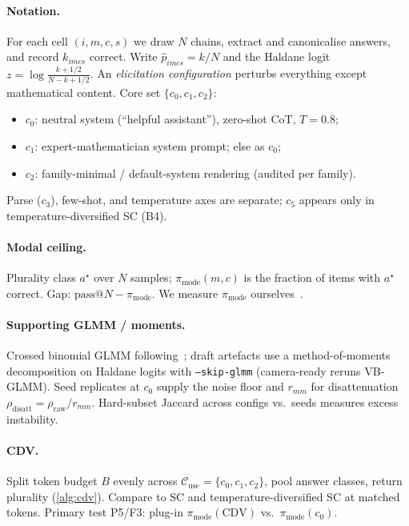 \documentclass{article}
\newcommand{\pmode}{\pi_{\mathrm{mode}}}
\newcommand{\phat}{\hat{p}}
\newcommand{\rdis}{\rho_{\mathrm{disatt}}}
\begin{document}
\paragraph{Notation.}
For each cell $(i,m,c,s)$ we draw $N$ chains, extract and canonicalise answers,
and record $k_{imcs}$ correct. Write $\phat_{imcs}=k/N$ and the Haldane logit
$z=\log\frac{k+1/2}{N-k+1/2}$. An \emph{elicitation configuration} perturbs
everything except mathematical content. Core set $\{c_0,c_1,c_2\}$:
\begin{itemize}\itemsep1pt
  \item $c_0$: neutral system (``helpful assistant''), zero-shot CoT, $T{=}0.8$;
  \item $c_1$: expert-mathematician system prompt; else as $c_0$;
  \item $c_2$: family-minimal / default-system rendering (audited per family).
\end{itemize}
Parse ($c_3$), few-shot, and temperature axes are separate; $c_5$ appears only in
temperature-diversified SC (B4).

\paragraph{Modal ceiling.}
Plurality class $a^\star$ over $N$ samples; $\pmode(m,c)$ is the fraction of
items with $a^\star$ correct. Gap: $\mathrm{pass@}N-\pmode$. We measure
$\pmode$ ourselves~\citep{brown2024monkeys,bay2026modal}.

\paragraph{Supporting GLMM / moments.}
Crossed binomial GLMM following~\citet{tee2026,prompteval2024}; draft artefacts
use a method-of-moments decomposition on Haldane logits with
\texttt{--skip-glmm} (camera-ready reruns VB-GLMM). Seed replicates at $c_0$
supply the noise floor and $r_{mm}$ for disattenuation
$\rdis=\rho_{\mathrm{raw}}/r_{mm}$. Hard-subset Jaccard across configs vs.\ seeds
measures excess instability.

\paragraph{CDV.}
Split token budget $B$ evenly across $\mathcal{C}_{\mathrm{use}}=\{c_0,c_1,c_2\}$,
pool answer classes, return plurality (\cref{alg:cdv}). Compare to SC and
temperature-diversified SC at matched tokens. Primary test P5/F3: plug-in
$\pmode(\mathrm{CDV})$ vs.\ $\pmode(c_0)$.
\end{document}
